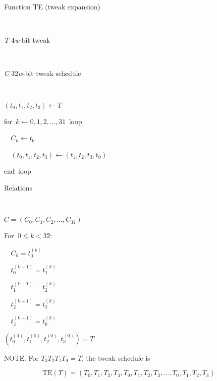 \documentclass[a4paper,oneside,english]{amsart}
\numberwithin{equation}{section}
\numberwithin{figure}{section}
\newenvironment{lyxlist}[1]
{\begin{list}{}
{\settowidth{\labelwidth}{#1}
 \setlength{\leftmargin}{\labelwidth}
 \addtolength{\leftmargin}{\labelsep}
 \renewcommand{\makelabel}[1]{##1\hfil}}}
{\end{list}}
\newenvironment{lyxcode}
{\par\begin{list}{}{
\setlength{\rightmargin}{\leftmargin}
\setlength{\listparindent}{0pt}\raggedright
\setlength{\itemsep}{0pt}
\setlength{\parsep}{0pt}
\normalfont\ttfamily}\item[]}
{\end{list}}
\begin{document}
\begin{algorithm}


\caption{\label{alg:Function-TE}Function TE (tweak expansion) }

\begin{description}
\item [{Input}]~

\begin{lyxlist}{00.00.0000}
\item [{\emph{T}}] 4\emph{w}-bit tweak
\end{lyxlist}
\item [{Output}]~

\begin{lyxlist}{00.00.0000}
\item [{\emph{C}}] 32\emph{w}-bit tweak schedule
\end{lyxlist}
\item [{Pseudo-code}]~\end{description}
\begin{lyxcode}
$(t_{0},t_{1},t_{2},t_{3})\leftarrow T$

for~$k\leftarrow0,1,2,\ldots,31$~loop

~~$C_{k}\leftarrow t_{0}$

~~$(t_{0},t_{1},t_{2},t_{3})\leftarrow(t_{1},t_{2},t_{3},t_{0})$

end~loop~\end{lyxcode}
\begin{description}
\item [{Relations}]~\end{description}
\begin{lyxcode}
$C=(C_{0},C_{1},C_{2},\ldots,C_{31})$

For~$0\leqslant k<32$:~

~~$C_{k}=t_{0}^{(k)}$

~~$t_{0}^{(k+1)}=t_{1}^{(k)}$

~~$t_{1}^{(k+1)}=t_{2}^{(k)}$

~~$t_{2}^{(k+1)}=t_{3}^{(k)}$

~~$t_{3}^{(k+1)}=t_{0}^{(k)}$

$(t_{0}^{(0)},t_{1}^{(0)},t_{2}^{(0)},t_{3}^{(0)})=T$~\end{lyxcode}
\end{algorithm}


NOTE. For $T_{3}T_{2}T_{1}T_{0}=T$, the tweak schedule is

\[
\mathrm{TE}(T)=(T_{0},T_{1},T_{2},T_{3},T_{0},T_{1},T_{2},T_{3},\ldots,T_{0},T_{1},T_{2},T_{3})
\]
\end{document}
